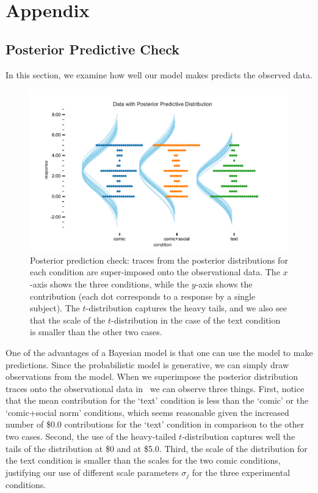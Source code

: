 \section{Appendix}
\label{sec:Appendix}
\subsection{Posterior Predictive Check}
\label{sub:Posterior Predictive Check}

In this section, we examine how well our model makes predicts the observed data.

\begin{figure}[htb]
    \includegraphics[width=1\textwidth]{./hari-code/posterior_predictions.pdf}
    \caption{Posterior prediction check: traces from the posterior distributions for each condition are super-imposed onto the observational data. The $x$-axis shows the three conditions, while the $y$-axis shows the contribution (each dot corresponds to a response by a single subject). The $t$-distribution captures the heavy tails, and we also see that the scale of the $t$-distribution in the case of the text condition is smaller than the other two cases. }
    \label{fig:posteriorprediction}
\end{figure}

One of the advantages of a Bayesian model is that one can use the model to make predictions. Since the probabilistic model is generative, we can simply draw observations from the model. When we superimpose the posterior distribution traces onto the observational data in~ we can observe three things. First, notice that the mean contribution for the `text' condition is less than the `comic' or the `comic+social norm' conditions, which seems reasonable given the increased number of \$0.0 contributions for the `text' condition in comparison to the other two cases. Second, the use of the heavy-tailed $t$-distribution captures well the tails of the distribution at \$0 and at \$5.0. Third, the scale of the distribution for the text condition is smaller than the scales for the two comic conditions, justifying our use of different scale parameters $\sigma_j$ for the three experimental conditions.


